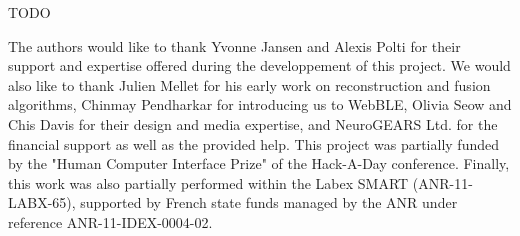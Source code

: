 \documentclass[sigchi]{acmart}
\begin{document}
TODO

\begin{acks}
The authors would like to thank Yvonne Jansen and Alexis Polti for their support and expertise offered during the developpement of this project. We would also like to thank Julien Mellet for his early work on reconstruction and fusion algorithms, Chinmay Pendharkar for introducing us to WebBLE, Olivia Seow and Chis Davis for their design and media expertise, and NeuroGEARS Ltd. for the financial support as well as the provided help. This project was partially funded by the "Human Computer Interface Prize" of the Hack-A-Day conference. Finally, this work was also partially performed within the Labex SMART (ANR-11-LABX-65), supported by French state funds managed by the ANR under reference ANR-11-IDEX-0004-02.
\end{acks}




\end{document}
